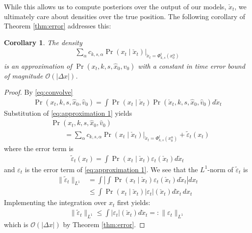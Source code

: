 \documentclass[letterpaper,10pt,conference]{ieeeconf}
\newtheorem{cor}{Corollary}
\begin{document}
While this allows us to compute posteriors over the output of our models, $\check{x}_t$, we ultimately care about densities over the true position.
The following corollary of Theorem \ref{thm:error} addresses this:
\begin{cor} \label{cor:error}
	The density
	\begin{align}
		\sum_\alpha c_{k,s,\alpha} \left. \Pr( x_t \mid \check{x}_t ) \right|_{ \check{x}_t = \Phi_{k,s}^t( x_0^\alpha) } \label{eq:approximation 2}
	\end{align}
	is an approximation of $\Pr( x_t, k, s, \hat{x}_0, \hat{v}_0)$ with a constant in time error bound of magnitude $\mathcal{O}( |\Delta x| )$.
\end{cor}
\begin{proof}
	By \eqref{eq:convolve}
	\begin{align*}
		\Pr(x_t, k, s, \hat{x}_0, \hat{v}_0) = \int \Pr( x_t \mid \check{x}_t ) \Pr( \check{x}_t, k,s,\hat{x}_0, \hat{v}_0) d\check{x}_t
	\end{align*}
	Substitution of \eqref{eq:approximation 1} yields
	\begin{align}
		&\Pr(x_t, k, s, \hat{x}_0, \hat{v}_0) \nonumber \\
		&\qquad = \sum_\alpha c_{k,s,\alpha} \left. \Pr( x_t \mid \check{x}_t ) \right|_{ \check{x}_t = \Phi_{k,s}^t( x_0^\alpha) } + \tilde{\varepsilon}_t(x_t)
	\end{align}
	where the error term is
	\begin{align}
		\tilde{\varepsilon}_t(x_t) = \int \Pr( x_t \mid \check{x}_t) \varepsilon_t( \check{x}_t) d \check{x}_t
	\end{align}
	and $\varepsilon_t$ is the error term of \eqref{eq:approximation 1}.
	We see that the $L^1$-norm of $\tilde{\varepsilon}_t$ is 
	\begin{align}
		\| \tilde{\varepsilon}_t \|_{L^1} &= \int \left| \int \Pr( x_t \mid \check{x}_t) \varepsilon_t( \check{x}_t) d \check{x}_t \right| dx_t \\
			&\leq \int \Pr( x_t \mid \check{x}_t ) | \varepsilon_t |( \check{x}_t) d\check{x}_t \, dx_t
	\end{align}
	Implementing the integration over $x_t$ first yields:
	\begin{align}
		\| \tilde{\varepsilon}_t \|_{L^1} \leq \int | \varepsilon_t |( \check{x}_t) d\check{x}_t =: \| \varepsilon_t \|_{L^1}
	\end{align}
	which is $\mathcal{O}( | \Delta x | )$ by Theorem \ref{thm:error}.
\end{proof}
\end{document}

